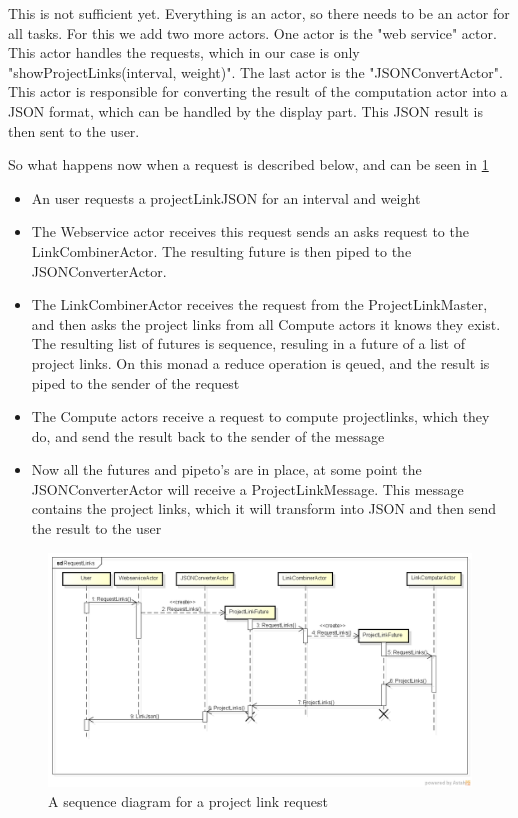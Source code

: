 \documentclass[10pt,a4paper]{article}
\begin{document}
This is not sufficient yet. Everything is an actor, so there needs to be an actor for all tasks. For this we add two more actors. One actor is the "web service" actor. This actor handles the requests, which in our case is only "showProjectLinks(interval, weight)". The last actor is the "JSONConvertActor". This actor is responsible for converting the result of the computation actor into a JSON format, which can be handled by the display part. This JSON result is then sent to the user.

So what happens now when a request is described below, and can be seen in \ref{fig:actor_seq}

\begin{itemize}
	\item{An user requests a projectLinkJSON for an interval and weight}
	\item{The Webservice actor receives this request sends an asks request to the LinkCombinerActor. The resulting future is then piped to the JSONConverterActor.}
	\item{The LinkCombinerActor receives the request from the ProjectLinkMaster, and then asks the project links from all Compute actors it knows they exist. The resulting list of futures is sequence, resuling in a future of a list of project links. On this monad a reduce operation is qeued, and the result is piped to the sender of the request}
	\item{The Compute actors receive a request to compute projectlinks, which they do, and send the result back to the sender of the message}
	\item{Now all the futures and pipeto's are in place, at some point the JSONConverterActor will receive a ProjectLinkMessage. This message contains the project links, which it will transform into JSON and then send the result to the user}
\end{itemize}

\begin{figure}[htb]
    \centering
    \includegraphics[width=1.0\textwidth]{RequestLinks}
    \caption{A sequence diagram for a project link request}
    \label{fig:actor_seq}
\end{figure}
\end{document}
